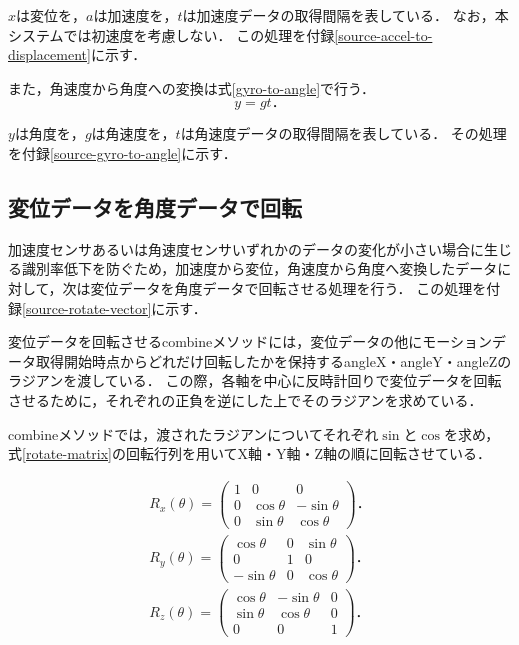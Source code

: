 $x$は変位を，$a$は加速度を，$t$は加速度データの取得間隔を表している．
なお，本システムでは初速度を考慮しない．
この処理を付録\ref{source-accel-to-displacement}に示す．

また，角速度から角度への変換は式\ref{gyro-to-angle}で行う．
\begin{equation}
\label{gyro-to-angle}
y = g t．
\end{equation}

$y$は角度を，$g$は角速度を，$t$は角速度データの取得間隔を表している．
その処理を付録\ref{source-gyro-to-angle}に示す．

\subsection{変位データを角度データで回転}
加速度センサあるいは角速度センサいずれかのデータの変化が小さい場合に生じる識別率低下を防ぐため，加速度から変位，角速度から角度へ変換したデータに対して，次は変位データを角度データで回転させる処理を行う．
この処理を付録\ref{source-rotate-vector}に示す．

変位データを回転させるcombineメソッドには，変位データの他にモーションデータ取得開始時点からどれだけ回転したかを保持するangleX・angleY・angleZのラジアンを渡している．
この際，各軸を中心に反時計回りで変位データを回転させるために，それぞれの正負を逆にした上でそのラジアンを求めている．

combineメソッドでは，渡されたラジアンについてそれぞれ$\sin$と$\cos$を求め，式\ref{rotate-matrix}の回転行列を用いてX軸・Y軸・Z軸の順に回転させている．

\begin{eqnarray}
\label{rotate-matrix}
R_x(\theta) = \left(
    \begin{array}{ccc}
        1 & 0 & 0 \\
        0 & \cos\theta & -\sin\theta \\
        0 & \sin\theta & \cos\theta
    \end{array}
\right)． \nonumber \\
R_y(\theta) = \left(
    \begin{array}{ccc}
        \cos\theta & 0 & \sin\theta \\
        0 & 1 & 0 \\
        -\sin\theta & 0 & \cos\theta
    \end{array}
\right)． \nonumber \\
R_z(\theta) = \left(
    \begin{array}{ccc}
        \cos\theta & -\sin\theta & 0 \\
        \sin\theta & \cos\theta & 0 \\
        0 & 0 & 1
    \end{array}
\right)．
\end{eqnarray}

